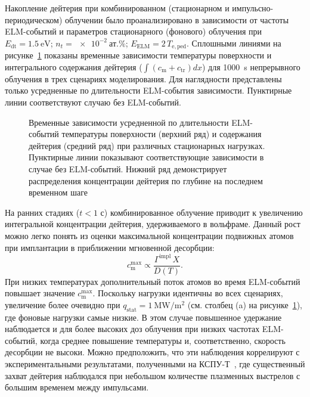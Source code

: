 Накопление дейтерия при комбинированном (стационарном и импульсно-периодическом) облучении было проанализировано в зависимости от частоты ELM-событий и параметров стационарного (фонового) облучения при $E_{\mathrm{dt}}=\SI{1.5}{\electronvolt}$; $n_{t}=\SI{e-2}{\text{ат.}\percent}$; $E_{\mathrm{ELM}}=2\, T_{\mathrm{e,ped}}$. Сплошными линиями на рисунке~\cref{fig:ch3/ELMs_frequency} показаны временные зависимости температуры поверхности и интегрального содержания дейтерия ($\int \left(c_{\mathrm{m}}+c_{\mathrm{tr}}\right)dx$) для \SI{1000}{\second} непрерывного облучения в трех сценариях моделирования. Для наглядности представлены только усредненные по длительности ELM-события зависимости. Пунктирные линии соответствуют случаю без ELM-событий.
\begin{figure}[ht]
	\caption{Временные зависимости усредненной по длительности ELM-событий температуры поверхности (верхний ряд) и содержания дейтерия (средний ряд) при различных стационарных нагрузках. Пунктирные линии показывают соответствующие зависимости в случае без ELM-событий. Нижний ряд демонстрирует распределения концентрации дейтерия по глубине на последнем временном шаге}\label{fig:ch3/ELMs_frequency}
\end{figure}
На ранних стадиях ($t<1$ с) комбинированное облучение приводит к увеличению интегральной концентрации дейтерия, удерживаемого в вольфраме. Данный рост можно легко понять из оценки максимальной концентрации подвижных атомов при имплантации в приближении мгновенной десорбции:
\begin{equation}
	\label{eq:ch3/max_c}
	c_{\mathrm{m}}^{\max}\propto \frac{\Gamma^{\mathrm{impl}} \, X}{D(T)}.
\end{equation}
При низких температурах дополнительный поток атомов во время ELM-событий повышает значение $c_{\mathrm{m}}^{\max}$. Поскольку нагрузки идентичны во всех сценариях, увеличение более очевидно при $q_{\mathrm{stat}}=\SI{1}{\mega\watt\per\meter\squared}$ (см. столбец (a) на рисунке~\cref{fig:ch3/ELMs_frequency}), где фоновые нагрузки самые низкие. В этом случае повышенное удержание наблюдается и для более высоких доз облучения при низких частотах ELM-событий, когда среднее повышение температуры и, соответственно, скорость десорбции не высоки. Можно предположить, что эти наблюдения коррелируют с экспериментальными результатами, полученными на КСПУ-Т~\cite{Ogorodnikova,Poskakalov2020}, где существенный захват дейтерия наблюдался при небольшом количестве плазменных выстрелов с большим временем между импульсами.

